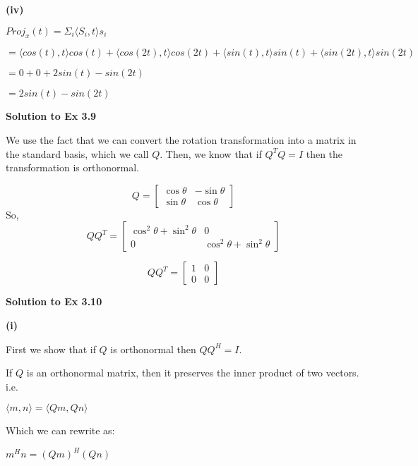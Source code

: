 \documentclass[letterpaper,12pt]{article}
\theoremstyle{definition}
\begin{document}
\begin{spacing}{1.3}{}
	\setlength{\leftskip}{10pt}
	
	\textbf{(iv)}
	
	\setlength{\leftskip}{20pt}
	
	$Proj_{x}(t) = \Sigma_{i}\langle S_i , t \rangle s_i$
	
	$= \langle cos(t), t \rangle cos(t) + \langle cos(2t), t \rangle cos(2t) + \langle sin(t), t \rangle sin(t) + \langle sin(2t), t \rangle sin(2t)$
	
	$= 0 + 0 + 2sin(t) - sin(2t)$
	
	$=2sin(t) - sin(2t)$
	
	\setlength{\leftskip}{0pt}
	
	\textbf{Solution to Ex 3.9}
	
	\setlength{\leftskip}{20pt}
	
	
	We use the fact that we can convert the rotation transformation into a matrix in the standard basis, which we call $Q$. Then, we know that if $Q^TQ = I$ then the transformation is orthonormal.
	
	\[Q=
	\begin{bmatrix}
	\cos \theta & -\sin \theta \\
	\sin \theta & \cos \theta
	\end{bmatrix}
	\]
	So,
	\[Q Q^{T}=
	\begin{bmatrix}
	\cos^{2} \theta + \sin^{2} \theta & 0 \\
	0 & \cos^{2} \theta + \sin^{2} \theta
	\end{bmatrix}
	\]
	
	\[Q Q^{T}=
	\begin{bmatrix}
	1 & 0 \\
	0 & 0
	\end{bmatrix}
	\]
	
	
	\setlength{\leftskip}{0pt}
	
	\textbf{Solution to Ex 3.10}
	
	\setlength{\leftskip}{10pt}
	
	\textbf{(i)}
	
	\setlength{\leftskip}{20pt}
	
	First we show that if $Q$ is orthonormal then $QQ^H = I$.
	
	If $Q$ is an orthonormal matrix, then it preserves the inner product of two vectors. i.e.
	
	$\langle m, n \rangle = \langle Qm, Qn \rangle$
	
	Which we can rewrite as:
	
	$m^Hn = (Qm)^H(Qn)$
	

\end{spacing}
\end{document}
